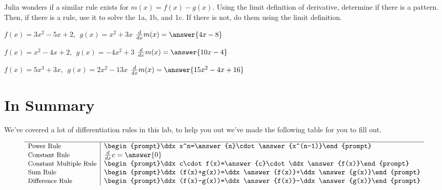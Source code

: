 \documentclass{ximera}
\begin{document}
\begin{question}
Julia wonders if a similar rule exists for $m(x) = f(x)-g(x)$. Using the limit definition of derivative, determine if there is a pattern. Then, if there is a rule, use it to solve the 1a, 1b, and 1c. If there is not, do them using the limit definition.

$f(x) = 3x^2 - 5x + 2$, $\;g(x) = x^2 + 3x$ \hspace{11mm} $\frac{d}{dx}m(x) =  \answer{4x-8}$

$f(x) = x^2 - 4x + 2$, $\;g(x) = -4x^2 + 3$ \hspace{10mm} $\frac{d}{dx}m(x) =  \answer{10x-4}$

$f(x) = 5x^3 + 3x$, $\;g(x) = 2x^2 - 13x$ \hspace{13mm} $\frac{d}{dx}m(x) =  \answer{15x^2-4x+16}$
\end{question}
\section{In Summary}
We've covered a lot of differentiation rules in this lab, to help you out we've made the following table for you to fill out.
\begin{question}
\[
\begin{array}{l|l}
\hline
  \small\text{Power Rule}&\begin{prompt}\ddx x^n=\answer{n}\cdot\answer{x^(n-1)}\end{prompt}\\
  \small\text{Constant Rule} & \ddx c=\answer{0}\\
  \small\text{Constant Multiple Rule} & \begin{prompt}\ddx c\cdot f(x)=\answer{c}\cdot\ddx \answer{f(x)}\end{prompt}\\
  \small\text{Sum Rule} & \begin{prompt}\ddx (f(x)+g(x))=\ddx \answer{f(x)}+\ddx \answer{g(x)}\end{prompt}\\
  \small\text{Difference Rule} & \begin{prompt}\ddx (f(x)-g(x))=\ddx \answer{f(x)}-\ddx \answer{g(x)}\end{prompt}
\end{array}
\]
\end{question}

\pagebreak
\end{document}
